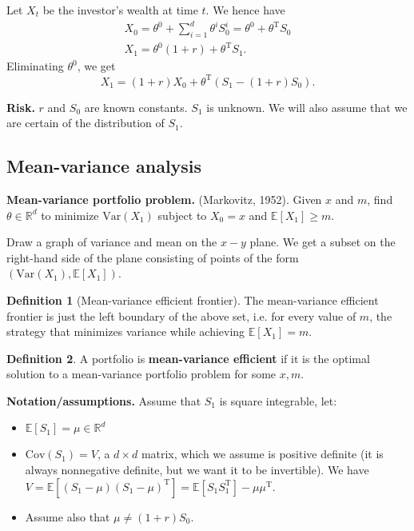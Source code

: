 \documentclass{article}
\theoremstyle{definition}
\newtheorem{defn}{Definition}[section]
\begin{document}
\vspace{1mm}
    
Let $X_t$ be the investor's wealth at time $t$. We hence have 
\begin{align*}
    X_0 = \theta^0 + \sum_{i=1}^{d} \theta^i S^i_0 = \theta^0 + \theta^{\text{T}}S_0 \\ X_1 = \theta^0(1+r) + \theta^{\text{T}}S_1.
\end{align*}
Eliminating $\theta^0$, we get \[
X_1 = (1+r)X_0  + \theta^{\text{T}}(S_1 - (1+r)S_0).
\]

\textbf{Risk.} $r$ and $S_0$ are known constants. $S_1$ is unknown. We will also assume that we are certain of the distribution of $S_1$.

\subsection{Mean-variance analysis}

\textbf{Mean-variance portfolio problem.} (Markovitz, 1952). Given $x$ and $m$, find $\theta \in \mathbb{R}^d$ to minimize $\text{Var}(X_1)$ subject to $X_0 = x$ and $\mathbb{E}[X_1]\ge m$.

Draw a graph of variance and mean on the $x-y$ plane. We get a subset on the right-hand side of the plane consisting of points of the form $(\text{Var}(X_1), \mathbb{E}[X_1])$.

\begin{defn}[Mean-variance efficient frontier]
    The mean-variance efficient frontier is just the left boundary of the above set, i.e. for every value of $m$, the strategy that minimizes variance while achieving $\mathbb{E}[X_1]=m$.
\end{defn}
\begin{defn}
    A portfolio is \textbf{mean-variance efficient} if it is the optimal solution to a mean-variance portfolio problem for some $x,m$.
\end{defn}

\textbf{Notation/assumptions.} Assume that $S_1$ is square integrable, let:
\begin{itemize}
    \item $\mathbb{E}[S_1]= \mu \in \mathbb{R}^d$
    \item $\text{Cov}(S_1) = V$, a $d \times d$ matrix, which we assume is positive definite (it is always nonnegative definite, but we want it to be invertible). We have $V  =\mathbb{E}[(S_1- \mu)(S_1 - \mu)^{\text{T}}] = \mathbb{E}[S_1S_1^{\text{T}}]-\mu \mu^{\text{T}}$.
    \item Assume also that $\mu \neq (1+r)S_0$.
\end{itemize}
\end{document}

